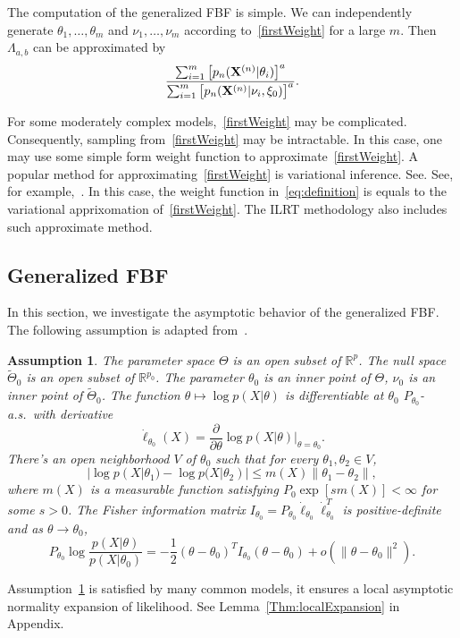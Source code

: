 \documentclass[11pt]{article}
\theoremstyle{plain}
\newtheorem{assumption}{\quad\quad Assumption}
\theoremstyle{definition}
\theoremstyle{remark}
\begin{document}
The computation of the generalized FBF is simple.
We can independently generate $\theta_1,\ldots,\theta_m$ and $\nu_1,\ldots,\nu_m$ according to~\eqref{firstWeight}  for a large $m$.
Then $\Lambda_{a,b}$ can be approximated by
\begin{equation*}
    \frac{\sum_{i=1}^m \big[p_n(\mathbf{X}^{(n)}|\theta_i)\big]^{a}}{\sum_{i=1}^m\big[p_n(\mathbf{X}^{(n)}|\nu_i,\xi_0)\big]^{a}}.
\end{equation*}


For some moderately complex models,~\eqref{firstWeight} may be complicated.
Consequently, sampling from~\eqref{firstWeight} may be intractable.
In this case, one may use some simple form weight function to approximate~\eqref{firstWeight}.
A popular method for approximating~\eqref{firstWeight} is variational inference.
See. See, for example,~\cite{blei2017}.
In this case, the weight function in~\eqref{eq:definition} is equals to the variational apprixomation of~\eqref{firstWeight}.
The ILRT methodology also includes such approximate method.




\subsection{Generalized FBF}
In this section, we investigate the asymptotic behavior of the generalized FBF.
The following assumption is adapted from~\cite{Kleijn2012The}.
\begin{assumption}\label{Assumption1}
The parameter space $\Theta$ is an open subset of $\mathbb{R}^p$. 
    The null space $\tilde{\Theta}_0$ is an open subset of $\mathbb{R}^{p_0}$.
    The parameter $\theta_0$ is an inner point of $\Theta$, $\nu_0$ is an inner point of $\tilde{\Theta}_0$.
    The function $\theta \mapsto \log p(X|\theta)$ is differentiable at $\theta_0$  $P_{\theta_0}$-a.s.\ with derivative 
$$\dot{\ell}_{\theta_0}(X)=\frac{\partial}{\partial \theta}\log p(X|\theta)\Big|_{\theta=\theta_0}.$$
There's an open neighborhood $V$ of $\theta_0$ such that for every $\theta_1,\theta_2\in V$,
        \begin{equation*}
            |\log p(X|\theta_1)-\log p(X|\theta_2)|\leq m(X)\|\theta_1-\theta_2\|,
        \end{equation*}
        where $m(X)$ is a measurable function satisfying $P_{0}\exp[s m(X)]<\infty$ for some $s>0$.
        The Fisher information matrix $I_{\theta_0}=P_{\theta_0}\dot{\ell}_{\theta_0}\dot{\ell}_{\theta_0}^T$ is positive-definite and as $\theta\to \theta_0$,
    \begin{equation*}
        P_{\theta_0} \log \frac{p(X|\theta)}{ p(X|\theta_0)}
        =-\frac{1}{2}(\theta-\theta_0)^T I_{\theta_0} (\theta-\theta_0)+o(\|\theta-\theta_0\|^2).
    \end{equation*}
\end{assumption}     
Assumption~\ref{Assumption1} is satisfied by many common models, it ensures a local asymptotic normality expansion of likelihood. See Lemma~\ref{Thm:localExpansion} in Appendix.
\end{document}
